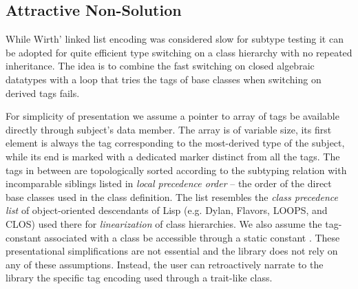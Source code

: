 \subsection{Attractive Non-Solution}
\label{sec:cotc}



While Wirth' linked list encoding was considered slow for subtype testing it can 
be adopted for quite efficient type switching on a class hierarchy with no 
repeated inheritance. The idea is to combine the fast switching on closed 
algebraic datatypes with a loop that tries the tags of base classes when 
switching on derived tags fails.


For simplicity of presentation we assume a pointer to array of tags be available 
directly through subject's  data member. The array is of 
variable size, its first element is always the tag corresponding to the 
most-derived type of the subject, while its end is marked with a dedicated 
 marker distinct from all the tags. The tags in between are 
topologically sorted according to the subtyping relation with incomparable 
siblings listed in \emph{local precedence order} -- the order of the direct base 
classes used in the class definition. The list resembles the \emph{class 
precedence list} of object-oriented descendants of Lisp (e.g. Dylan, Flavors, 
LOOPS, and CLOS) used there for \emph{linearization} of class hierarchies.
We also assume the tag-constant associated with a class 
 be accessible through a static constant . These presentational
simplifications are not essential and the library does not rely on any of these 
assumptions. Instead, the user can retroactively narrate to the library the 
specific tag encoding used through a trait-like class.

